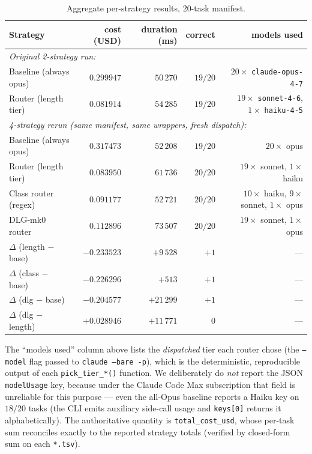 \documentclass[11pt,a4paper]{article}
\begin{document}
\begin{table}[h]
\centering
\caption{Aggregate per-strategy results, 20-task manifest.}
\label{tab:results}
\begin{tabular}{lrrrr}
\toprule
\textbf{Strategy} & \textbf{cost (USD)} & \textbf{duration (ms)} &
\textbf{correct} & \textbf{models used} \\
\midrule
\multicolumn{5}{l}{\emph{Original 2-strategy run:}} \\
Baseline (always opus) & $0.299947$  & $50\,270$ & $19/20$ &
$20\times$ \texttt{claude-opus-4-7} \\
Router (length tier)    & $0.081914$  & $54\,285$ & $19/20$ &
$19\times$ \texttt{sonnet-4-6}, $1\times$ \texttt{haiku-4-5} \\
\midrule
\multicolumn{5}{l}{\emph{4-strategy rerun (same manifest, same wrappers, fresh dispatch):}} \\
Baseline (always opus) & $0.317473$  & $52\,208$ & $19/20$ &
$20\times$ opus \\
Router (length tier)    & $0.083950$  & $61\,736$ & $20/20$ &
$19\times$ sonnet, $1\times$ haiku \\
Class router (regex)    & $0.091177$  & $52\,721$ & $20/20$ &
$10\times$ haiku, $9\times$ sonnet, $1\times$ opus \\
DLG-mk0 router          & $0.112896$  & $73\,507$ & $20/20$ &
$19\times$ sonnet, $1\times$ opus \\
\midrule
$\Delta$ (length $-$ base) & $-0.233523$ & $+9\,528$  & $+1$ & --- \\
$\Delta$ (class $-$ base)  & $-0.226296$ & $+513$     & $+1$ & --- \\
$\Delta$ (dlg $-$ base)    & $-0.204577$ & $+21\,299$ & $+1$ & --- \\
$\Delta$ (dlg $-$ length)  & $+0.028946$ & $+11\,771$ & $0$  & --- \\
\bottomrule
\end{tabular}
\end{table}

The ``models used'' column above lists the \emph{dispatched} tier each
router chose (the \texttt{--model} flag passed to \texttt{claude
--bare -p}), which is the deterministic, reproducible output of each
\texttt{pick\_tier\_*()} function. We deliberately do \emph{not} report
the JSON \texttt{modelUsage} key, because under the Claude Code Max
subscription that field is unreliable for this purpose --- even the
all-Opus baseline reports a Haiku key on $18/20$ tasks (the CLI emits
auxiliary side-call usage and \texttt{keys[0]} returns it
alphabetically). The authoritative quantity is
\texttt{total\_cost\_usd}, whose per-task sum reconciles exactly to the
reported strategy totals (verified by closed-form sum on each
\texttt{*.tsv}).
\end{document}
